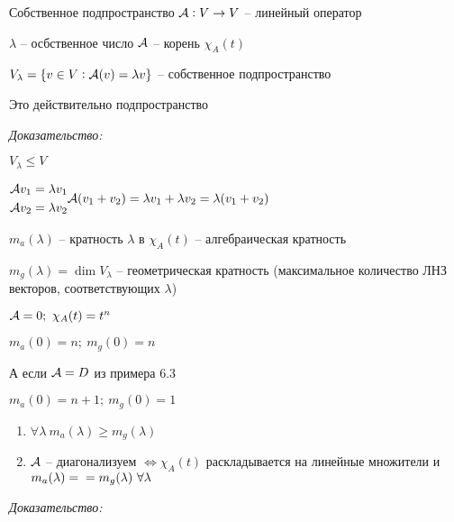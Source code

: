 \documentclass[12pt]{article}
\begin{document}
\begin{defin}{Собственное подпространство}
    $\mathcal{A} : V \to V$ -- линейный оператор

    $\lambda$ -- осбственное число $\mathcal{A}$ -- корень $\chi_A(t)$

    $V_{\lambda} = \{ v \in V : \mathcal{A}(v) = \lambda v \}$ -- собственное подпространство
\end{defin}

\begin{Remark}{}
    Это действительно подпространство 
\end{Remark}

\textit{Доказательство:}

$V_\lambda \leq V$

$\begin{gathered}
    \mathcal{A} v_1 = \lambda v_1 \\
    \mathcal{A} v_2 = \lambda v_2
\end{gathered} \mathcal{A}(v_1 + v_2) = \lambda v_1 + \lambda v_2 = \lambda(v_1 + v_2)$

\begin{defin}{}
    $m_a(\lambda)$ -- кратность $\lambda$ в $\chi_A(t)$ -- алгебраическая кратность

    $m_g(\lambda) = \dim V_\lambda$ -- геометрическая кратность (максимальное количество ЛНЗ векторов, соответствующих $\lambda$)
\end{defin}

\begin{Example}{}
    $\mathcal{A} = 0;\ \chi_A(t) = t^n$

    $m_a(0) = n;\ m_g(0) = n$

    А если $\mathcal{A} = D$ из примера 6.3

    $m_a(0) = n + 1;\ m_g(0) = 1$
\end{Example}

\begin{theo}{}
    \begin{enumerate}
        \item $\forall \lambda\ m_a(\lambda) \geq m_g(\lambda)$
        \item $\mathcal{A}$ -- диагонализуем $\Leftrightarrow \chi_A(t)$ раскладывается на линейные множители и $m_a(\lambda) = \\ = m_g(\lambda)\ \forall \lambda$
    \end{enumerate}
\end{theo}

\textit{Доказательство:}
\end{document}
